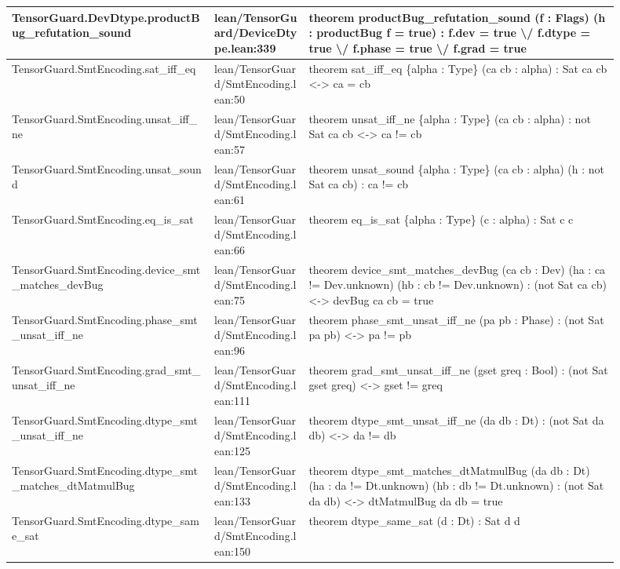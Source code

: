 \documentclass[10pt]{article}
\begin{document}
\begin{longtable}{|p{0.30\linewidth}|p{0.14\linewidth}|p{0.46\linewidth}|}
\hline
TensorGuard.DevDtype.productBug\_refutation\_sound & lean/TensorGuard/DeviceDtype.lean:339 & theorem productBug\_refutation\_sound (f : Flags) (h : productBug f = true) : f.dev = true \textbackslash{}/ f.dtype = true \textbackslash{}/ f.phase = true \textbackslash{}/ f.grad = true \\
\hline
TensorGuard.SmtEncoding.sat\_iff\_eq & lean/TensorGuard/SmtEncoding.lean:50 & theorem sat\_iff\_eq \{alpha : Type\} (ca cb : alpha) : Sat ca cb <-> ca = cb \\
\hline
TensorGuard.SmtEncoding.unsat\_iff\_ne & lean/TensorGuard/SmtEncoding.lean:57 & theorem unsat\_iff\_ne \{alpha : Type\} (ca cb : alpha) : not  Sat ca cb <-> ca != cb \\
\hline
TensorGuard.SmtEncoding.unsat\_sound & lean/TensorGuard/SmtEncoding.lean:61 & theorem unsat\_sound \{alpha : Type\} (ca cb : alpha) (h : not  Sat ca cb) : ca != cb \\
\hline
TensorGuard.SmtEncoding.eq\_is\_sat & lean/TensorGuard/SmtEncoding.lean:66 & theorem eq\_is\_sat \{alpha : Type\} (c : alpha) : Sat c c \\
\hline
TensorGuard.SmtEncoding.device\_smt\_matches\_devBug & lean/TensorGuard/SmtEncoding.lean:75 & theorem device\_smt\_matches\_devBug (ca cb : Dev) (ha : ca != Dev.unknown) (hb : cb != Dev.unknown) : (not  Sat ca cb) <-> devBug ca cb = true \\
\hline
TensorGuard.SmtEncoding.phase\_smt\_unsat\_iff\_ne & lean/TensorGuard/SmtEncoding.lean:96 & theorem phase\_smt\_unsat\_iff\_ne (pa pb : Phase) : (not  Sat pa pb) <-> pa != pb \\
\hline
TensorGuard.SmtEncoding.grad\_smt\_unsat\_iff\_ne & lean/TensorGuard/SmtEncoding.lean:111 & theorem grad\_smt\_unsat\_iff\_ne (gset greq : Bool) : (not  Sat gset greq) <-> gset != greq \\
\hline
TensorGuard.SmtEncoding.dtype\_smt\_unsat\_iff\_ne & lean/TensorGuard/SmtEncoding.lean:125 & theorem dtype\_smt\_unsat\_iff\_ne (da db : Dt) : (not  Sat da db) <-> da != db \\
\hline
TensorGuard.SmtEncoding.dtype\_smt\_matches\_dtMatmulBug & lean/TensorGuard/SmtEncoding.lean:133 & theorem dtype\_smt\_matches\_dtMatmulBug (da db : Dt) (ha : da != Dt.unknown) (hb : db != Dt.unknown) : (not  Sat da db) <-> dtMatmulBug da db = true \\
\hline
TensorGuard.SmtEncoding.dtype\_same\_sat & lean/TensorGuard/SmtEncoding.lean:150 & theorem dtype\_same\_sat (d : Dt) : Sat d d \\

\end{longtable}
\end{document}
